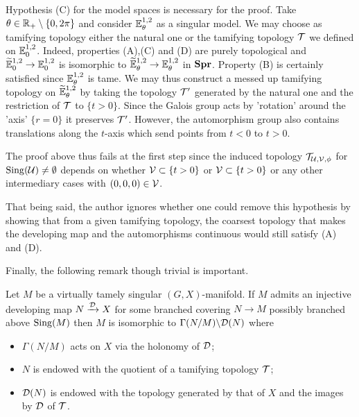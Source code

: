 \begin{rem}\label{rem:hypothesis_model_spaces_necessary}   Hypothesis (C) for the model spaces is necessary for the proof.  Take $\theta \in \mathbb R_+\setminus \{0,2\pi\}$ and consider ${\mathbb E}^{1,2}_{\theta}$ as a singular model.
We may choose as tamifying topology either the natural one or the tamifying topology $\mathcal{T}$ we defined on ${\mathbb E}^{1,2}_{0}$. Indeed, properties (A),(C) and (D) are purely topological and ${\widetilde {\mathbb{E}}}^{1,2}_0 \rightarrow \mathbb{E}^{1,2}_0$ is isomorphic to $\widetilde {\mathbb{E}}_\theta^{1,2}\rightarrow {\mathbb E}^{1,2}_{\theta}$ in $\mathbf{Spr}$. 
Property (B) is certainly satisfied since ${\mathbb E}^{1,2}_{\theta}$ is tame.
We may thus construct a messed up tamifying topology on $\widetilde {\mathbb{E}}_\theta^{1,2}$ by taking the topology $\mathcal{T}'$ generated by the natural one and the restriction of $\mathcal{T}$ to $\{t>0\}$. Since  the Galois group acts by 'rotation' around the 'axis' $\{r=0\}$ it preserves $\mathcal{T}'$. However, the automorphism group also contains translations along the $t$-axis which send points from $t<0$ to $t>0$. 

The proof above thus fails at the first step since the induced topology $\mathcal{T}_{\mathcal{U},\mathcal V,\phi}$ for $\mathrm{Sing}(\mathcal{U})\neq\emptyset$ depends on whether $\mathcal V\subset \{t>0\}$ or $\mathcal V \subset \{t>0\}$ or any other intermediary cases with $(0,0,0)\in \mathcal V$.



That being said, the author ignores whether one could remove this hypothesis by showing that from  a given tamifying topology, the coarsest topology that makes the developing map and the automorphisms continuous would still satisfy (A) and (D).


\end{rem}



 Finally, the following remark though trivial is important.
 \begin{rem}\label{rem:quotient_virtually_tame} Let $M$ be a virtually tamely singular $(G,X)$-manifold. If $M$ admits an injective developing map $N\xrightarrow{\mathcal{D}}X$ for some branched covering $N\rightarrow M$ possibly branched above $\mathrm{Sing}(M)$ then $M$ is isomorphic to $\Gamma(N/M)\backslash\mathcal{D}(N)$ where 
 \begin{itemize}
  \item $\Gamma(N/M)$ acts on $X$ via the holonomy of $\mathcal{D}$;
  \item $N$ is endowed with the quotient of a tamifying topology $\mathcal{T}$;
  \item $\mathcal{D}(N)$ is endowed with the topology generated by that of $X$ and the images by $\mathcal{D}$ of $\mathcal{T}$.
 \end{itemize} 
 \end{rem}


